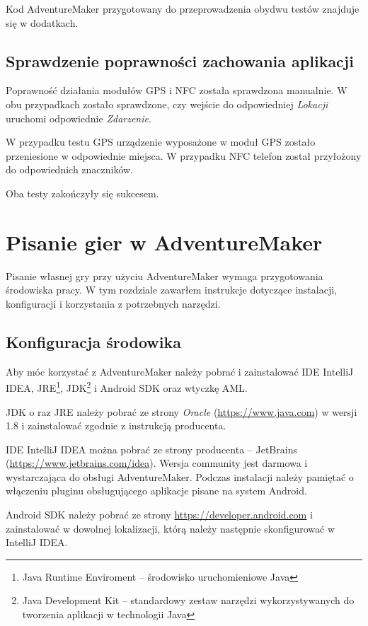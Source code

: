 \documentclass[openright]{xmgr}
\begin{document}
Kod AdventureMaker przygotowany do przeprowadzenia obydwu testów znajduje się w dodatkach.

\section{Sprawdzenie poprawności zachowania aplikacji}

Poprawność działania modułów GPS i NFC została sprawdzona manualnie. W obu przypadkach zostało sprawdzone, czy wejście do odpowiedniej \textit{Lokacji} uruchomi odpowiednie \textit{Zdarzenie}.

W przypadku testu GPS urządzenie wyposażone w moduł GPS zostało przeniesione w odpowiednie miejsca. W przypadku NFC telefon został przyłożony do odpowiednich znaczników. 

Oba testy zakończyły się sukcesem.  

\chapter{Pisanie gier w AdventureMaker}
Pisanie własnej gry przy użyciu AdventureMaker wymaga przygotowania środowiska pracy. W tym rozdziale zawarłem instrukcje dotyczące instalacji, konfiguracji i korzystania z potrzebnych narzędzi. 

\section{Konfiguracja środowika}

Aby móc korzystać z AdventureMaker należy pobrać i zainstalować IDE IntelliJ IDEA, JRE\footnote{Java Runtime Enviroment -- środowisko uruchomieniowe Java}, JDK\footnote{Java Development Kit -- standardowy zestaw narzędzi wykorzystywanych do tworzenia aplikacji w technologii Java} i Android SDK oraz wtyczkę AML.

JDK o raz JRE należy pobrać ze strony \textit{Oracle} (\url{https://www.java.com}) w wersji 1.8 i zainstalować zgodnie z instrukcją producenta.

IDE IntelliJ IDEA można pobrać ze strony producenta -- JetBrains (\url{https://www.jetbrains.com/idea}). Wersja community jest darmowa i wystarczająca do obsługi AdventureMaker. Podczas instalacji należy pamiętać o włączeniu pluginu obsługującego aplikacje pisane na system Android.

Android SDK  należy pobrać ze strony \url{https://developer.android.com} i zainstalować w dowolnej lokalizacji, którą należy następnie skonfigurować w IntelliJ IDEA.
\end{document}
